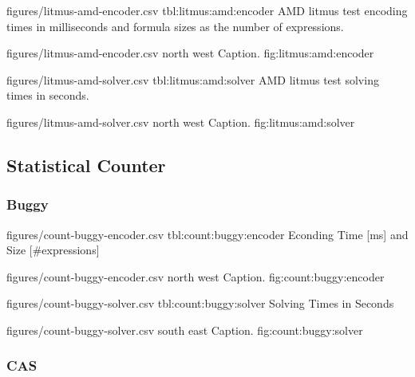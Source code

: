 \EncoderStatsTable
  {figures/litmus-amd-encoder.csv}
  {tbl:litmus:amd:encoder}
  {AMD litmus test encoding times in milliseconds and formula sizes as the number of expressions.}

\EncoderStatsGraph
  {figures/litmus-amd-encoder.csv}
  {north west}
  {Caption.}
  {fig:litmus:amd:encoder}

\newpage
{}

\SolverStatsTable
  {figures/litmus-amd-solver.csv}
  {tbl:litmus:amd:solver}
  {AMD litmus test solving times in seconds.}

\SolverStatsGraph
  {figures/litmus-amd-solver.csv}
  {north west}
  {Caption.}
  {fig:litmus:amd:solver}

\newpage

\subsection*{Statistical Counter}

\subsubsection*{Buggy}

\renewcommand{\StatsTableRowHeader}[1]{#1}


\EncoderStatsTable
  {figures/count-buggy-encoder.csv}
  {tbl:count:buggy:encoder}
  {Econding Time [ms] and Size [\#expressions]}

\EncoderStatsGraph
  {figures/count-buggy-encoder.csv}
  {north west}
  {Caption.}
  {fig:count:buggy:encoder}

\newpage
{}

\SolverStatsTable
  {figures/count-buggy-solver.csv}
  {tbl:count:buggy:solver}
  {Solving Times in Seconds}


\SolverStatsGraph
  {figures/count-buggy-solver.csv}
  {south east}
  {Caption.}
  {fig:count:buggy:solver}

\newpage

\subsubsection*{CAS}

